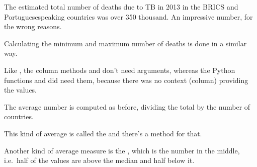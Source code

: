\documentclass[letterpaper,10pt,english]{sphinxmanual}
\begin{document}


The estimated total number of deaths due to TB in 2013 in the BRICS and Portuguese\sphinxhyphen{}speaking countries was over 350 thousand. An impressive number, for the wrong reasons.

Calculating the minimum and maximum number of deaths is done in a similar way.









Like  , the column methods  and  don’t need arguments, whereas the Python functions  and  did need them, because there was no context (column) providing the values.

The average number is computed as before, dividing the total by the number of countries.





This kind of average is called the  and there’s a method for that.





Another kind of average measure is the  , which is the number in the middle, i.e. half of the values are above the median and half below it.
\end{document}
